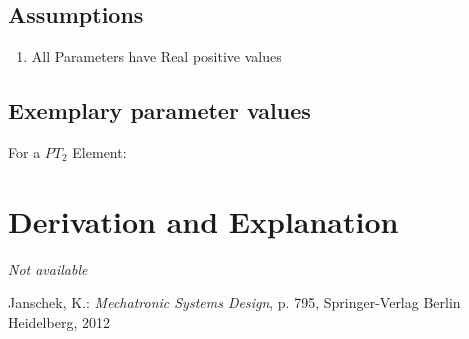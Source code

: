 \documentclass[10pt,a4paper]{article}
\begin{document}
	\subsection{Assumptions} %
	\begin{enumerate} %
		\item All Parameters have Real positive values
	\end{enumerate}
	
	
	\subsection{Exemplary parameter values}
	For a $PT_2$ Element:\\
	

	
	\section{Derivation and Explanation} %
	
	\textit{Not available}
	
	
	\begin{thebibliography}{10}		
		Janschek, K.: 
		\textit{Mechatronic Systems Design}, p. 795, Springer-Verlag Berlin Heidelberg, 2012
	\end{thebibliography}
\end{document}
